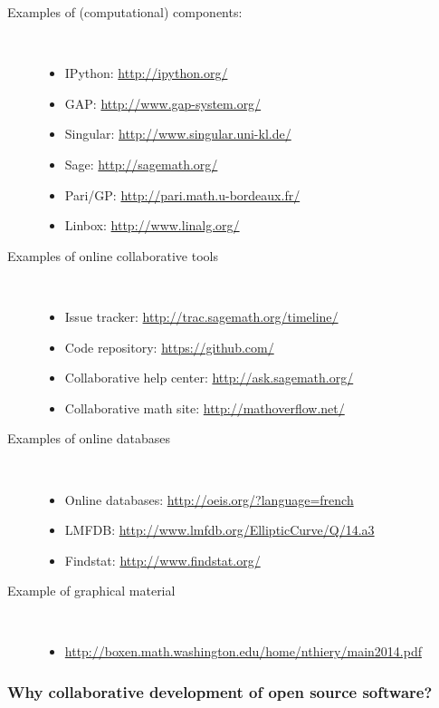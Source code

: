 \documentclass[a4paper,11pt]{article}
\begin{document}
{\begin{description}
  \item[Examples of (computational) components:]\ 
    \begin{itemize}
    \item IPython: \url{http://ipython.org/}
    \item GAP: \url{http://www.gap-system.org/}
    \item Singular: \url{http://www.singular.uni-kl.de/}
    \item Sage: \url{http://sagemath.org/}
    \item Pari/GP: \url{http://pari.math.u-bordeaux.fr/}
    \item Linbox: \url{http://www.linalg.org/}
    \end{itemize}
  \item[Examples of online collaborative tools]\ 
    \begin{itemize}
    \item Issue tracker: \url{http://trac.sagemath.org/timeline/}
    \item Code repository: \url{https://github.com/}
    \item Collaborative help center: \url{http://ask.sagemath.org/}
    \item Collaborative math site: \url{http://mathoverflow.net/}
    \end{itemize}
  \item[Examples of online databases]\ 
    \begin{itemize}
    \item Online databases: \url{http://oeis.org/?language=french}
    \item LMFDB: \url{http://www.lmfdb.org/EllipticCurve/Q/14.a3}
    \item Findstat: \url{http://www.findstat.org/}
    \end{itemize}
  \item[Example of graphical material]\ 
    \begin{itemize}
    \item \url{http://boxen.math.washington.edu/home/nthiery/main2014.pdf}
    \end{itemize}
  \end{description}
}


\clearpage

\subsubsection{Why collaborative development of open source software?}
\end{document}
